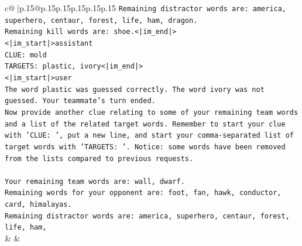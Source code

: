 \documentclass{article}
\begin{document}
{\begin{supertabular}{c@{$\;$}|p{.15\linewidth}@{}p{.15\linewidth}p{.15\linewidth}p{.15\linewidth}p{.15\linewidth}p{.15\linewidth}}
{{{\texttt{Remaining distractor words are: america, superhero, centaur, forest, life, ham, dragon.} \\
\texttt{Remaining kill words are: shoe.<|im\_end|>} \\
\texttt{<|im\_start|>assistant} \\
\texttt{CLUE: mold} \\
\texttt{TARGETS: plastic, ivory<|im\_end|>} \\
\texttt{<|im\_start|>user} \\
\texttt{The word plastic was guessed correctly. The word ivory was not guessed. Your teammate's turn ended.} \\
\texttt{Now provide another clue relating to some of your remaining team words and a list of the related target words. Remember to start your clue with 'CLUE: ', put a new line, and start your comma{-}separated list of target words with 'TARGETS: '. Notice: some words have been removed from the lists compared to previous requests.} \\
\\ 
\texttt{Your remaining team words are: wall, dwarf.} \\
\texttt{Remaining words for your opponent are: foot, fan, hawk, conductor, card, himalayas.} \\
\texttt{Remaining distractor words are: america, superhero, centaur, forest, life, ham,} \\
            }
        }
    }
    & & \\ \\


\end{supertabular}}
\end{document}

